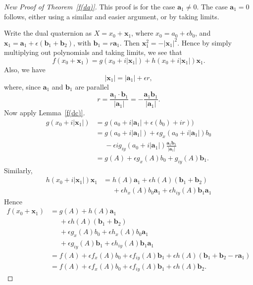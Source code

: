 \documentclass[12pt,reqno]{amsart}
\begin{document}
\begin{proof}[New Proof of Theorem~\ref{f(dq)}] This proof is for the case $\bm a_1 \ne 0$.  The case $\bm a_1 = 0$ follows, either using a similar and easier argument, or by taking limits.

Write the dual quaternion as $X = x_0 + \bm x_1$, where $x_0 = a_0 + \epsilon b_0$, and $\bm x_1 = \bm a_1 + \epsilon (\bm b_1 + \bm b_2)$, with $\bm b_1 = r \bm a_1$.  Then $\bm x_1^2 = -|\bm x_1|^2$.  Hence by simply multiplying out polynomials and taking limits, we see that
\begin{equation}
f(x_0 + \bm x_1) = g(x_0 + i |\bm x_1|) + h(x_0 + i |\bm x_1|) \bm x_1 .
\end{equation}
Also, we have
\begin{equation}
|\bm x_1| = |\bm a_1| + \epsilon r ,
\end{equation}
where, since $\bm a_1$ and $\bm b_1$ are parallel
\begin{equation}
r = \frac{\bm a_1 \cdot \bm b_1}{|\bm a_1|} = - \frac{\bm a_1 \bm b_1}{|\bm a_1|} .
\end{equation}
Now apply Lemma~\ref{f(dc)}.
\begin{equation}
\begin{aligned}
g(x_0 + i |\bm x_1|) &= g(a_0 + i|\bm a_1| + \epsilon (b_0) + i r) )
\\&=
g(a_0 + i |\bm a_1|)
+ \epsilon g_x(a_0 + i |\bm a_1|) b_0
\\&\phantom{{}={}}
- \epsilon i g_{iy}(a_0 + i |\bm a_1|) \frac{\bm a_1 \bm b_1}{|\bm a_1|}
\\&= g(A) + \epsilon g_x(A) b_0 + g_{iy}(A) \bm b_1 .
\end{aligned}
\end{equation}
Similarly,
\begin{equation}
\begin{aligned}
h(x_0 + i |\bm x_1|) \bm x_1 &= 
h(A) \bm a_1
+ \epsilon h(A) (\bm b_1 + \bm b_2)
\\&\phantom{{}={}}
+ \epsilon h_x(A) b_0 \bm a_1
+ \epsilon h_{iy}(A) \bm b_1 \bm a_1
\end{aligned}
\end{equation}
Hence
\begin{equation}
\begin{aligned}
f(x_0 + \bm x_1) &=
g(A) + h(A) \bm a_1
\\&\phantom{{}={}}
+ \epsilon h(A) (\bm b_1 + \bm b_2)
\\&\phantom{{}={}}
+ \epsilon g_x(A) b_0
+ \epsilon h_x(A) b_0 \bm a_1
\\&\phantom{{}={}}
+ \epsilon g_{iy}(A) \bm b_1
+ \epsilon h_{iy}(A) \bm b_1 \bm a_1
\\&=
f(A) + \epsilon f_x(A) b_0 + \epsilon f_{iy}(A) \bm b_1 + \epsilon h(A) (\bm b_1 + \bm b_2 -r \bm a_1)
\\&=
f(A) + \epsilon f_x(A) b_0 + \epsilon f_{iy}(A) \bm b_1 + \epsilon h(A) \bm b_2 .
\end{aligned}
\end{equation}
\end{proof}
\end{document}
